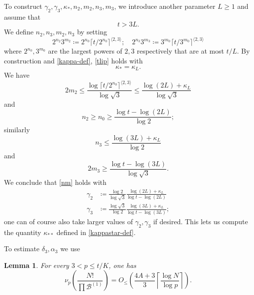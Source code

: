 \documentclass[10pt,a4paper,reqno]{amsart}
\numberwithin{equation}{section}
\theoremstyle{plain}
\newtheorem{lemma}[theorem]{Lemma}
\theoremstyle{definition}
\newcommand\tuple{{\mathcal B}}
\begin{document}
To construct $\gamma_2, \gamma_3, \kappa_*, n_2, m_2, n_3, m_3$, we introduce another parameter $L \geq 1$ and assume that
\begin{equation}\label{t-lower}
  t > 3L.
\end{equation}
We define $n_2,n_3,m_2,n_3$ by setting
$$
2^{n_2} 3^{m_2} \coloneqq 2^{n_0} \lceil t/2^{n_0} \rceil^{\langle 2,3 \rangle}; \quad 
2^{n_3} 3^{m_3} \coloneqq 3^{m_0} \lceil t/3^{m_0} \rceil^{\langle 2,3 \rangle}$$
where $2^{n_0}, 3^{m_0}$ are the largest powers of $2,3$ respectively that are at most $t/L$.  By construction and \eqref{kappa-def}, \eqref{tlip} holds with
\begin{equation}\label{kappas-eq}
  \kappa_* = \kappa_L.
\end{equation}
We have
$$  2m_2 \leq \frac{\log \lceil t/2^{n_0} \rceil^{\langle 2,3 \rangle}}{\log \sqrt{3}}  \leq \frac{\log(2L) + \kappa_L}{\log \sqrt{3}}  
$$
and
$$n_2 \geq n_0 \geq \frac{\log t - \log(2L)}{\log 2};$$
similarly
$$ n_3 \leq \frac{\log(3L)+\kappa_L}{\log 2}$$
and
$$ 2m_3 \geq \frac{\log t - \log(3L)}{\log \sqrt{3}}.$$
We conclude that \eqref{nm} holds with
\begin{equation}\label{gammas-def}
\begin{split}
\gamma_2 &\coloneqq \frac{\log 2}{\log \sqrt{3}} \frac{\log(2L) + \kappa_L}{\log t - \log(2L)} \\
\gamma_3 &\coloneqq \frac{\log \sqrt{3}}{\log 2} \frac{\log(3L) + \kappa_L}{\log t - \log(3L)};
\end{split}
\end{equation}
one can of course also take larger values of $\gamma_2,\gamma_3$ if desired.
This lets us compute the quantity $\kappa_{**}$ defined in \eqref{kappastar-def}.

To estimate $\delta_3, \alpha_3$ we use

\begin{lemma}\label{val-bound} For every $3 < p \leq t/K$, one has
\begin{equation}\label{nup} 
  \nu_p\left(\frac{N!}{\prod \tuple^{(1)}}\right) =  
O_{\leq}\left(\frac{4A+3}{3} \left\lceil \frac{\log N}{\log p}  \right\rceil\right).
\end{equation}
\end{lemma}
\end{document}
